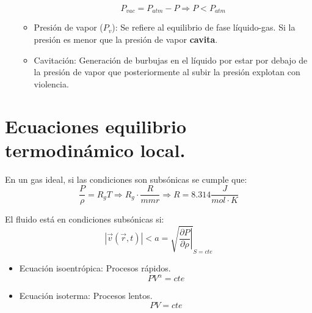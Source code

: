 \begin{enumerate}
\begin{itemize}
		\[P_{vac}= P_{atm}-P \Rightarrow P<P_{atm}\]
		
		\item Presión de vapor ($P_v$): Se refiere al equilibrio de fase líquido-gas. Si la presión es menor que la presión de vapor \textbf{cavita}.
		\item Cavitación: Generación de burbujas en el líquido por estar por debajo de la presión de vapor que posteriormente al subir la presión explotan con violencia. 
	\end{itemize}
	
\end{enumerate}

\section{Ecuaciones equilibrio termodinámico local.}
En un gas ideal, si las condiciones son subsónicas se cumple que:
\[\frac{P}{\rho}=R_gT \Rightarrow R_g\cdot\frac{R}{mmr} \Rightarrow R ={8.314} \frac{J}{mol\cdot K}\]

El fluido está en condiciones subsónicas si:
\[\left| \vec{v}(\vec{r},t) \right|<a=\sqrt {\left. \frac{\partial P}{\partial \rho} \right|}_{S=cte}\]

\begin{itemize}
	\item Ecuación isoentrópica: Procesos rápidos.
	\[PV^\alpha=cte\]
	\item Ecuación isoterma: Procesos lentos.
	\[PV=cte\]
\end{itemize}

